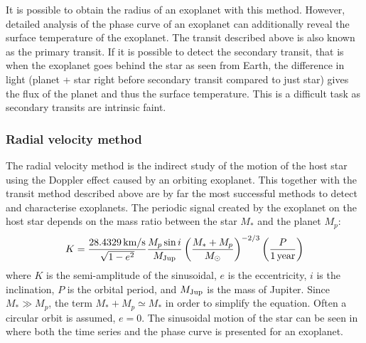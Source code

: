 It is possible to obtain the radius of an exoplanet with this method. However, detailed analysis of
the phase curve of an exoplanet can additionally reveal the surface temperature of the exoplanet.
The transit described above is also known as the primary transit. If it is possible to detect the
secondary transit, that is when the exoplanet goes behind the star as seen from Earth, the
difference in light (planet + star right before secondary transit compared to just star) gives the
flux of the planet and thus the surface temperature. This is a difficult task as secondary transits
are intrinsic faint.


\subsubsection{Radial velocity method}
\label{sec:rvmethod}

The radial velocity method is the indirect study of the motion of the host star using the Doppler
effect caused by an orbiting exoplanet. This together with the transit method described above are by
far the most successful methods to detect and characterise exoplanets. The periodic signal created
by the exoplanet on the host star depends on the mass ratio between the star $M_\ast$ and the planet
$M_p$:
\begin{align}
  K = \frac{\SI{28.4329}{km/s}}{\sqrt{1-e^2}} \frac{M_p\sin i}{M_\mathrm{Jup}} \left( \frac{M_\ast+M_p}{M_\odot} \right)^{-2/3} \left(\frac{P}{\SI{1}{year}}\right)  \label{eq:rv}
\end{align}
where $K$ is the semi-amplitude of the sinusoidal, $e$ is the eccentricity, $i$ is the inclination,
$P$ is the orbital period, and $M_\mathrm{Jup}$ is the mass of Jupiter. Since $M_\ast \gg M_p$, the term
$M_\ast+M_p\simeq M_\ast$ in order to simplify the equation. Often a circular orbit is assumed,
$e=0$. The sinusoidal motion of the star can be seen in  where both the time
series and the phase curve is presented for an exoplanet.

